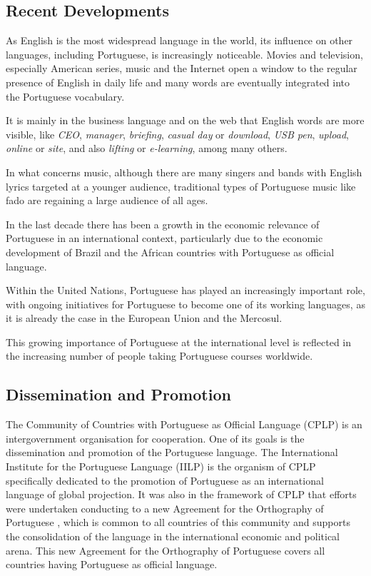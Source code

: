 \begin{multicols}{2}
\subsection{Recent Developments}

As English is the most widespread language in the world, its influence on other languages, including Portuguese, is increasingly noticeable. 
Movies and television, especially American series, music and the Internet open a window to the regular presence of English in daily life and many words are eventually integrated into the Portuguese vocabulary.

It is mainly in the business language and on the web that English words are more visible, like \textit{CEO}, 
\textit{manager}, \textit{briefing}, \textit{casual day} or \textit{download}, 
\textit{USB pen}, \textit{upload}, \textit{online} or \textit{site}, and also \textit{lifting} or \textit{e-learning}, among many others. 

In what concerns music, although there are many singers and bands with English lyrics targeted at a younger audience, 
traditional types of Portuguese music like fado are regaining a large audience of all ages.

In the last decade there has been a growth in the economic relevance of Portuguese in an international context, particularly due to the economic development of Brazil
and the African countries with Portuguese as official language. 

Within the United Nations, Portuguese has played an increasingly important role, with ongoing initiatives for Portuguese to become one of its working languages, as it is already the case in the European Union and the Mercosul.

This growing importance of Portuguese at the international level is reflected in the increasing number of people taking Portuguese courses worldwide.



\subsection{Dissemination and Promotion}

The Community of Countries with Portuguese as Official Language (CPLP) is an intergovernment organisation for cooperation.
One of its goals is the dissemination and promotion of the Portuguese language. 
The International Institute for the Portuguese Language (IILP) is the organism of CPLP specifically dedicated to the
promotion of Portuguese as an international language of global projection. It was also in the framework of CPLP that efforts 
were undertaken conducting to a new Agreement for the Orthography of Portuguese \cite{pinto}, 
which is common to all countries of this community and supports the consolidation of the language in 
the international economic and political arena. 
This new Agreement for the Orthography of Portuguese covers all countries having Portuguese as official language.


\end{multicols}
